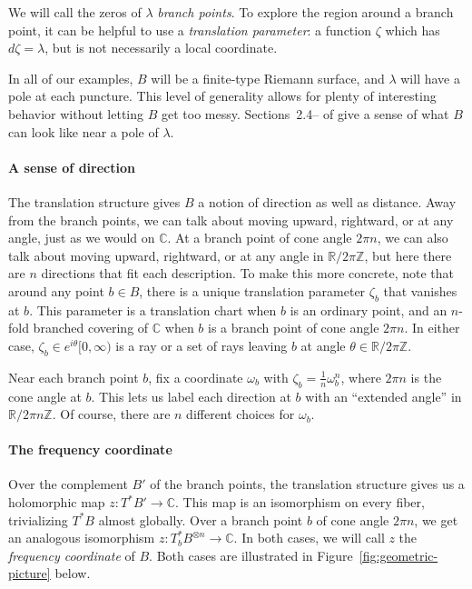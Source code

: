 \documentclass{article}
\newcommand{\maps}{\colon}
\newcommand{\Z}{\mathbb{Z}}
\newcommand{\R}{\mathbb{R}}
\newcommand{\C}{\mathbb{C}}
\theoremstyle{definition}
\theoremstyle{plain}
\begin{document}
We will call the zeros of $\lambda$ {\em branch points}. To explore the region around a branch point, it can be helpful to use a {\em translation parameter}: a function $\zeta$ which has $d\zeta = \lambda$, but is not necessarily a local coordinate.

In all of our examples, $B$ will be a finite-type Riemann surface, and $\lambda$ will have a pole at each puncture. This level of generality allows for plenty of interesting behavior without letting $B$ get too messy. Sections~2.4\;-- of \cite{gupta2013meromorphic} give a sense of what $B$ can look like near a pole of $\lambda$.
%
\paragraph{A sense of direction}
%
The translation structure gives $B$ a notion of direction as well as distance. Away from the branch points, we can talk about moving upward, rightward, or at any angle, just as we would on $\C$. At a branch point of cone angle $2\pi n$, we can also talk about moving upward, rightward, or at any angle in $\R/2\pi\Z$, but here there are $n$ directions that fit each description. To make this more concrete, note that around any point $b \in B$, there is a unique translation parameter $\zeta_b$ that vanishes at $b$. This parameter is a translation chart when $b$ is an ordinary point, and an $n$-fold branched covering of $\C$ when $b$ is a branch point of cone angle $2\pi n$. In either case, $\zeta_b \in e^{i\theta} [0, \infty)$ is a ray or a set of rays leaving $b$ at angle $\theta \in \R/2\pi\Z$.

Near each branch point $b$, fix a coordinate $\omega_b$ with $\zeta_b = \tfrac{1}{n} \omega_b^n$, where $2\pi n$ is the cone angle at $b$. This lets us label each direction at $b$ with an ``extended angle'' in $\R/2\pi n\Z$. Of course, there are $n$ different choices for $\omega_b$.
%
\paragraph{The frequency coordinate}\label{transl-freq}
%
Over the complement $B'$ of the branch points, the translation structure gives us a holomorphic map $z \maps T^*B' \to \C$. This map is an isomorphism on every fiber, trivializing $T^*B$ almost globally. Over a branch point $b$ of cone angle $2\pi n$, we get an analogous isomorphism $z \maps T^*_bB^{\otimes n} \to \C$. In both cases, we will call $z$ the {\em frequency coordinate} of $B$. Both cases are illustrated in Figure~\ref{fig:geometric-picture} below.
\begin{center}
\phaseSpaceLaplace
{}\label{fig:geometric-picture}
\end{center}
\end{document}

